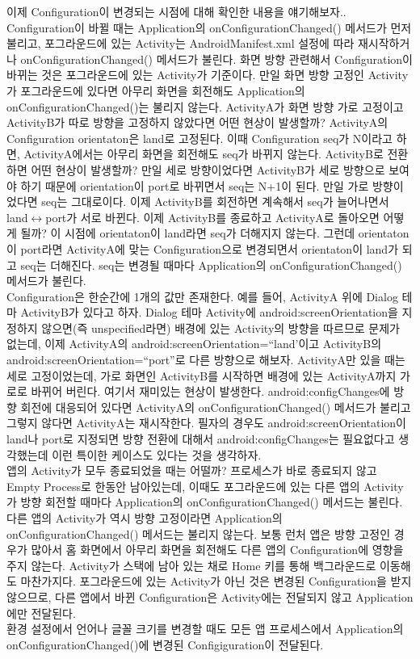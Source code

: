 이제 Configuration이 변경되는 시점에 대해 확인한 내용을 얘기해보자.. Configuration이 바뀔 때는 Application의 onConfigurationChanged() 메서드가 먼저 불리고, 포그라운드에 있는 Activity는 AndroidManifest.xml 설정에 따라 재시작하거나 onConfigurationChanged() 메서드가 불린다.
화면 방향 관련해서 Configuration이 바뀌는 것은 포그라운드에 있는 Activity가 기준이다. 만일 화면 방향 고정인 Activity가 포그라운드에 있다면 아무리 화면을 회전해도 Application의 onConfigurationChanged()는 불리지 않는다. ActivityA가 화면 방향 가로 고정이고 ActivityB가 따로 방향을 고정하지 않았다면 어떤 현상이 발생할까? ActivityA의 Configuration orientaton은 land로 고정된다. 이때 Configuration seq가 N이라고 하면, ActivityA에서는 아무리 화면을 회전해도 seq가 바뀌지 않는다. ActivityB로 전환하면 어떤 현상이 발생할까? 만일 세로 방향이었다면 ActivityB가 세로 방향으로 보여야 하기 때문에 orientation이 port로 바뀌면서 seq는 N+1이 된다. 만일 가로 방향이었다면 seq는 그대로이다. 이제 ActivityB를 회전하면 계속해서 seq가 늘어나면서 land$\leftrightarrow$port가 서로 바뀐다. 이제 ActivityB를 종료하고 ActivityA로 돌아오면 어떻게 될까? 이 시점에 orientaton이 land라면 seq가 더해지지 않는다. 그런데 orientaton이 port라면 ActivityA에 맞는 Configuration으로 변경되면서 orientaton이 land가 되고 seq는 더해진다. seq는 변경될 때마다 Application의 onConfigurationChanged() 메서드가 불린다.\\

Configuration은 한순간에 1개의 값만 존재한다. 예를 들어, ActivityA 위에 Dialog 테마 ActivityB가 있다고 하자. Dialog 테마 Activity에 android:screenOrientation을 지정하지 않으면(즉 unspecified라면) 배경에 있는 Activity의 방향을 따르므로 문제가 없는데, 이제 ActivityA의 android:screenOrientation=``land'이고 ActivityB의 android:screenOrientation=``port''로 다른 방향으로 해보자. 
ActivityA만 있을 때는 세로 고정이었는데, 가로 화면인 ActivityB를 시작하면 배경에 있는 ActivityA까지 가로로 바뀌어 버린다. 여기서 재미있는 현상이 발생한다. android:configChanges에 방향 회전에 대응되어 있다면 ActivityA의 onConfigurationChanged() 메서드가 불리고 그렇지 않다면 ActivityA는 재시작한다.  필자의 경우도 android:screenOrientation이 land나 port로 지정되면 방향 전환에 대해서 android:configChanges는 필요없다고 생각했는데 이런 특이한 케이스도 있다는 것을 생각하자.\\


앱의 Activity가 모두 종료되었을 때는 어떨까? 프로세스가 바로 종료되지 않고 Empty Process로 한동안 남아있는데, 이때도 포그라운드에 있는 다른 앱의 Activity가 방향 회전할 때마다 Application의 onConfigurationChanged() 메서드는 불린다. 
다른 앱의 Activity가 역시 방향 고정이라면 Application의 onConfigurationChanged() 메서드는 불리지 않는다. 보통 런처 앱은 방향 고정인 경우가 많아서 홈 화면에서 아무리 화면을 회전해도 다른 앱의 Configuration에 영향을 주지 않는다. 
Activity가 스택에 남아 있는 채로 Home 키를 통해 백그라운드로 이동해도 마찬가지다. 포그라운드에 있는 Activity가 아닌 것은 변경된 Configuration을 받지 않으므로, 다른 앱에서 바뀐 Configuration은 Activity에는 전달되지 않고 Application에만 전달된다.\\

환경 설정에서 언어나 글꼴 크기를 변경할 때도 모든 앱 프로세스에서 Application의 onConfigurationChanged()에 변경된 Configiguration이 전달된다.\\




